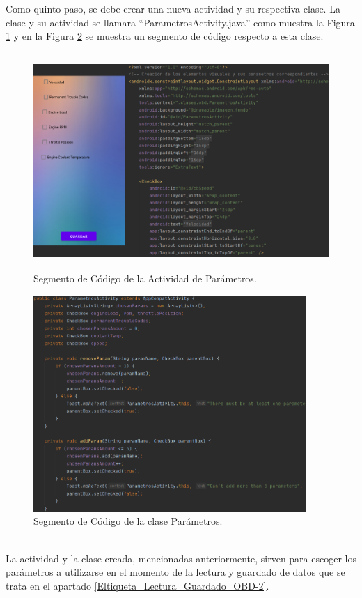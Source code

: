 \documentclass[a4paper,10pt, oneside, titlepage]{article}
\begin{document}
	\indent Como quinto paso, se debe crear una nueva actividad y su respectiva clase. La clase y su actividad se llamara ``ParametrosActivity.java'' como muestra la Figura \ref{Parametros_Activity} y en la Figura \ref{Codigo_Parametros_Activity} se muestra un segmento de código respecto a esta clase.
	\begin{figure}[!h]
		\centering
		\includegraphics[width = 1\linewidth, height = 8.2cm]{Parametros_Activity.png}
		\caption{Segmento de Código de la Actividad de Parámetros.}
		\label{Parametros_Activity}
	\end{figure}
	\begin{figure}[!h]
		\centering
		\includegraphics[width = 1\linewidth, height = 8.2cm]{Codigo_Parametros_Activity.png}
		\caption{Segmento de Código de la clase Parámetros.}
		\label{Codigo_Parametros_Activity}
	\end{figure} \\
	\indent La actividad y la clase creada, mencionadas anteriormente, sirven para escoger los parámetros a utilizarse en el momento de la lectura y guardado de datos que se trata en el apartado \ref{Eltiqueta_Lectura_Guardado_OBD-2}. \\\newline
\end{document}
